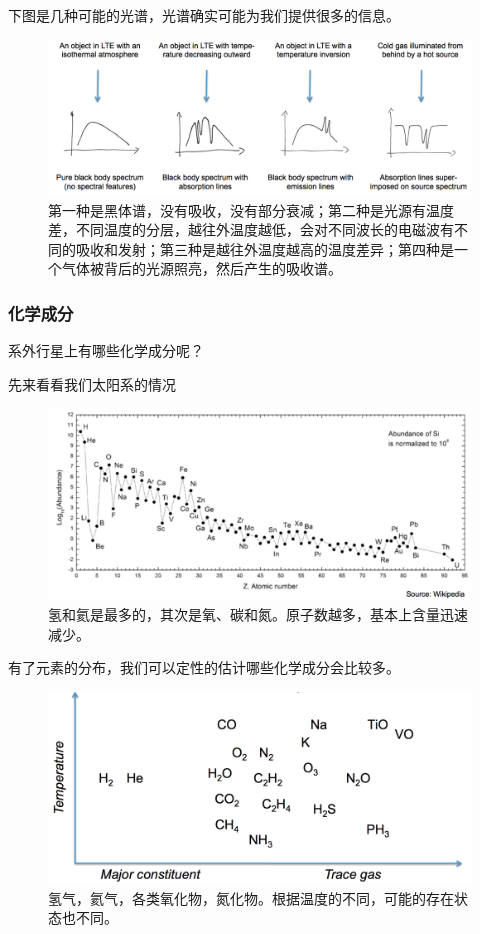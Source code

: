\documentclass[letterpaper,10pt,english]{sphinxmanual}
\begin{document}
下图是几种可能的光谱，光谱确实可能为我们提供很多的信息。
\begin{figure}[htbp]
\centering
\capstart

\includegraphics{emergentSpectra.png}
\caption{第一种是黑体谱，没有吸收，没有部分衰减；第二种是光源有温度差，不同温度的分层，越往外温度越低，会对不同波长的电磁波有不同的吸收和发射；第三种是越往外温度越高的温度差异；第四种是一个气体被背后的光源照亮，然后产生的吸收谱。}\end{figure}


\subsubsection{化学成分}
\label{atmosphere:id4}
系外行星上有哪些化学成分呢？

先来看看我们太阳系的情况
\begin{figure}[htbp]
\centering
\capstart

\includegraphics{elementAbundance.png}
\caption{氢和氦是最多的，其次是氧、碳和氮。原子数越多，基本上含量迅速减少。}\end{figure}

有了元素的分布，我们可以定性的估计哪些化学成分会比较多。
\begin{figure}[htbp]
\centering
\capstart

\includegraphics{chemical.png}
\caption{氢气，氦气，各类氧化物，氮化物。根据温度的不同，可能的存在状态也不同。}\end{figure}
\end{document}
